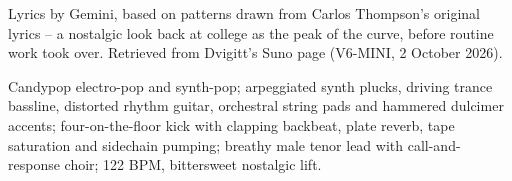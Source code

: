 
\begin{notes}
Lyrics by Gemini, based on patterns drawn from Carlos Thompson's original lyrics -- a nostalgic look back at college as the peak of the curve, before routine work took over. Retrieved from Dvigitt's Suno page (V6-MINI, 2 October 2026).
\end{notes}
\begin{style}
Candypop electro-pop and synth-pop; arpeggiated synth plucks, driving trance bassline, distorted rhythm guitar, orchestral string pads and hammered dulcimer accents; four-on-the-floor kick with clapping backbeat, plate reverb, tape saturation and sidechain pumping; breathy male tenor lead with call-and-response choir; 122 BPM, bittersweet nostalgic lift.
\end{style}
